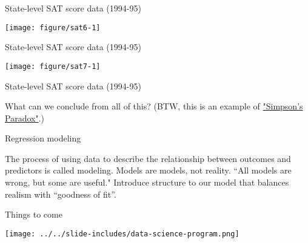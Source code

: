 \documentclass[table]{beamer}\usepackage[]{graphicx}\usepackage[]{color}
\makeatletter
\def\maxwidth{ %
  \ifdim\Gin@nat@width>\linewidth
    \linewidth
  \else
    \Gin@nat@width
  \fi
}
\newenvironment{knitrout}{}{} %
\makeatother
\begin{document}

\begin{frame}[fragile]{State-level SAT score data (1994-95)}

\begin{knitrout}
\color{fgcolor}
\texttt{[image: figure/sat6-1]} 

\end{knitrout}

\end{frame}




\begin{frame}[fragile]{State-level SAT score data (1994-95)}

\begin{knitrout}
\color{fgcolor}
\texttt{[image: figure/sat7-1]} 

\end{knitrout}

\end{frame}




\begin{frame}[fragile]{State-level SAT score data (1994-95)}

What can we conclude from all of this? (BTW, this is an example of \href{http://en.wikipedia.org/wiki/Simpson%27s_paradox}{"Simpson's Paradox"}.)

\end{frame}



\begin{frame}{Regression modeling}

The process of using data to describe the relationship between outcomes and predictors is called modeling.
\bi
	\myitem Models are models, not reality.
	\myitem ``All models are wrong, but some are useful."
	\myitem Introduce structure to our model that balances realism with ``goodness of fit''. \ei

\end{frame}



\begin{frame}{Things to come}

\texttt{[image: ../../slide-includes/data-science-program.png]}

\end{frame}
\end{document}
